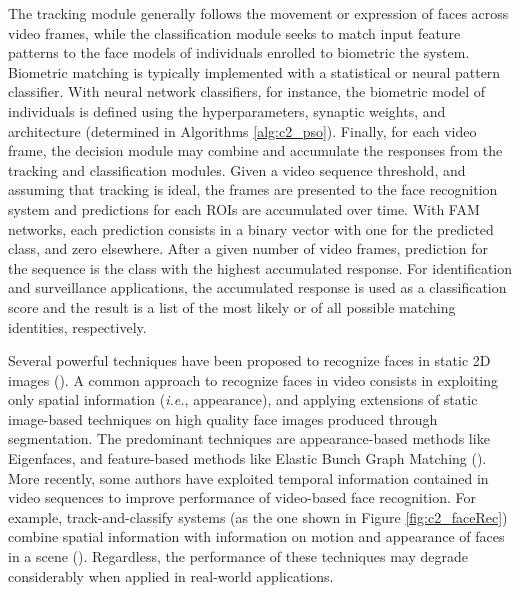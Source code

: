 The tracking module generally follows the movement or expression of faces across video frames, while the classification module seeks to match input feature patterns to the face models of individuals enrolled to biometric the system.
Biometric matching is typically implemented with a statistical or neural pattern classifier.
With neural network classifiers, for instance, the biometric model of individuals is defined using the hyperparameters, synaptic weights, and architecture (determined in Algorithms \ref{alg:c2_pso}).
Finally, for each video frame, the decision module may combine and accumulate the responses from the tracking and classification modules.
Given a video sequence threshold, and assuming that tracking is ideal, the
frames are presented to the face recognition system and predictions for each ROIs are accumulated over time.
With FAM networks, each prediction consists in a binary vector with one for the predicted class, and zero elsewhere.
After a given number of video frames, prediction for the sequence is the class with the highest accumulated response.
For identification and surveillance applications, the accumulated response is used as a classification score and the result is a list of the most likely or of all possible matching identities, respectively.

\begin{figure*}[!t] \centering
	\caption{A generic track-and-classify biometric system for video-based face recognition}
	\label{fig:c2_faceRec}
\end{figure*}

Several powerful techniques have been proposed to recognize faces in static 2D images (\cite{zhao03}).
A common approach to recognize faces in video consists in exploiting only spatial information (\emph{i.e.}, appearance), and applying extensions of static image-based techniques on high quality face images produced through segmentation.
The predominant techniques are appearance-based methods like Eigenfaces, and feature-based methods like Elastic Bunch Graph Matching (\cite{zhao03}).
More recently, some authors have exploited temporal information contained in video sequences to improve performance of video-based face recognition.
For example, track-and-classify systems (as the one shown in Figure \ref{fig:c2_faceRec}) combine spatial information with information on motion and appearance of faces in a scene (\cite{connolly10}).
Regardless, the performance of these techniques may degrade considerably when applied in real-world applications.

